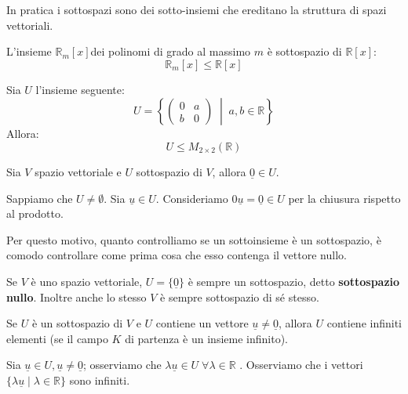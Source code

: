 \documentclass[
  a4paper,
]{article}
\begin{document}
In pratica i sottospazi sono dei sotto-insiemi che ereditano la
struttura di spazi vettoriali.

\begin{examplebox}
L'insieme \(\mathbb{R}_m[x]\)dei polinomi di grado al massimo \(m\) è
sottospazio di \(\mathbb{R}[x]\): \[
\mathbb{R}_m[x] \leq \mathbb{R}[x]
\]
\end{examplebox}

\begin{examplebox}
Sia \(U\) l'insieme seguente: \[  
U=\left\{  
\begin{pmatrix}  
0 & a\\  
b & 0  
\end{pmatrix}  
\;\middle|\; a,b\in\mathbb{R}  
\right\}  
\] Allora: \[
U \leq M_{2 \times 2}(\mathbb{R})
\]
\end{examplebox}

\begin{propositionbox}
Sia \(V\) spazio vettoriale e \(U\) sottospazio di \(V\), allora
\(\underline 0 \in U\).
\end{propositionbox}

\begin{proofbox}
Sappiamo che \(U \not = \emptyset\). Sia \(\underline u \in U\).
Consideriamo \(0\underline u = \underline 0 \in U\) per la chiusura
rispetto al prodotto.
\end{proofbox}

Per questo motivo, quanto controlliamo se un sottoinsieme è un
sottospazio, è comodo controllare come prima cosa che esso contenga il
vettore nullo.

\begin{observationbox}
Se \(V\) è uno spazio vettoriale, \(U = \{\underline 0\}\) è sempre un
sottospazio, detto \textbf{sottospazio nullo}. Inoltre anche lo stesso
\(V\) è sempre sottospazio di sé stesso.
\end{observationbox}

\begin{observationbox}
Se \(U\) è un sottospazio di \(V\) e \(U\) contiene un vettore
\(\underline u \not = \underline 0\), allora \(U\) contiene infiniti
elementi (se il campo \(K\) di partenza è un insieme infinito).
\end{observationbox}

\begin{proofbox}
Sia \(\underline u \in U, \underline u \not = \underline 0\); osserviamo
che \(\lambda \underline u \in U \; \forall \lambda \in \mathbb{R}\) .
Osserviamo che i vettori
\(\{\lambda \underline u \mid \lambda \in \mathbb{R}\}\) sono infiniti.
\end{proofbox}
\end{document}
